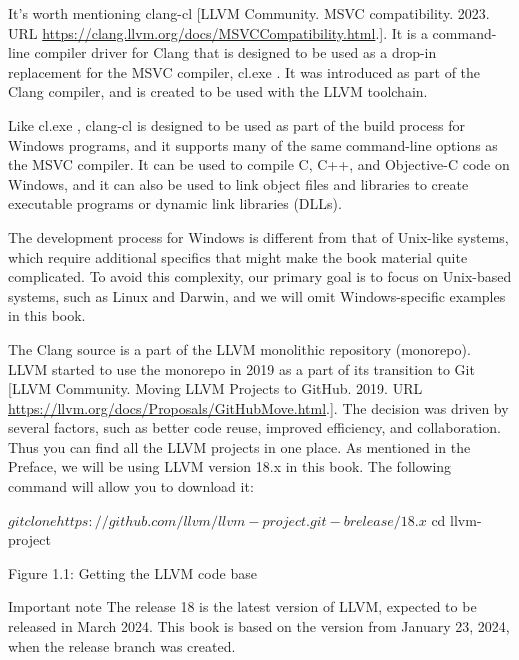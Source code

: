 It's worth mentioning clang-cl [LLVM Community. MSVC compatibility. 2023. URL \url{https://clang.llvm.org/docs/MSVCCompatibility.html}.]. It is a command-line compiler driver for Clang that is designed to be used as a drop-in replacement for the MSVC compiler, cl.exe . It was introduced as part of the Clang compiler, and is created to be used with the LLVM toolchain.

Like cl.exe , clang-cl is designed to be used as part of the build process for Windows programs, and it supports many of the same command-line options as the MSVC compiler. It can be used to compile C, C++, and Objective-C code on Windows, and it can also be used to link object files and libraries to create executable programs or dynamic link libraries (DLLs).

The development process for Windows is different from that of Unix-like systems, which require additional specifics that might make the book material quite complicated. To avoid this complexity, our primary goal is to focus on Unix-based systems, such as Linux and Darwin, and we will omit Windows-specific examples in this book.




The Clang source is a part of the LLVM monolithic repository (monorepo). LLVM started to use the monorepo in 2019 as a part of its transition to Git [LLVM Community. Moving LLVM Projects to GitHub. 2019. URL \url{https://llvm.org/docs/Proposals/GitHubMove.html}.]. The decision was driven by several factors, such as better code reuse, improved efficiency, and collaboration. Thus you can find all the LLVM projects in one place. As mentioned in the Preface, we will be using LLVM version 18.x in this book. The following command will allow you to download it:

\begin{shell}
$ git clone https://github.com/llvm/llvm-project.git -b release/18.x
$ cd llvm-project
\end{shell}

\begin{center}
Figure 1.1: Getting the LLVM code base
\end{center}


\begin{myNotic}{Important note}
The release 18 is the latest version of LLVM, expected to be released in March 2024. This book is based on the version from January 23, 2024, when the release branch was created.
\end{myNotic}


